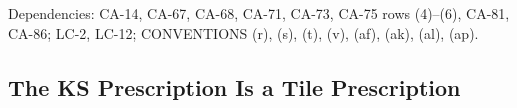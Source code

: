 Dependencies: CA-14, CA-67, CA-68, CA-71, CA-73, CA-75 rows (4)--(6), CA-81,
CA-86; LC-2, LC-12; CONVENTIONS (r), (s), (t), (v), (af), (ak), (al), (ap).


\subsection{The KS Prescription Is a Tile Prescription}

